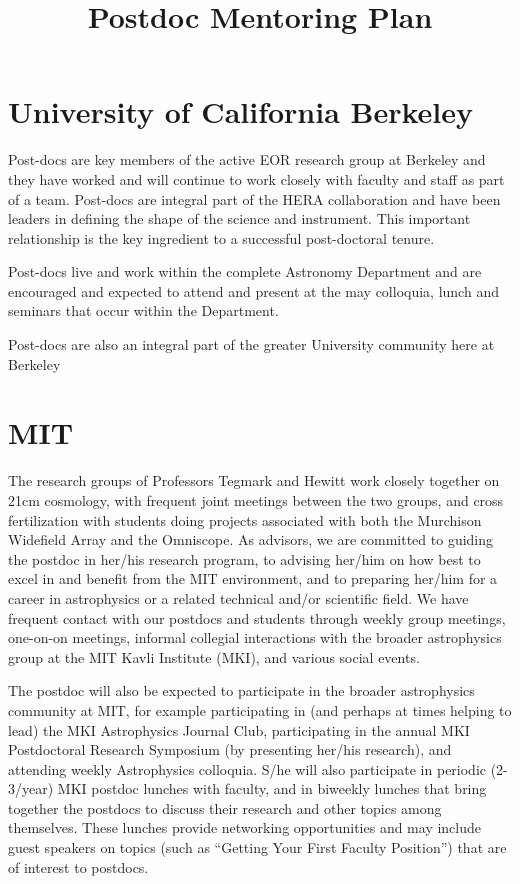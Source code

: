 \documentclass[preprint]{aastex}
\begin{document}
\title{Postdoc Mentoring Plan}

\section{University of California Berkeley}
Post-docs are key members of the active EOR research group at Berkeley and they have worked and will 
continue to work closely with faculty and staff as part of a team.  Post-docs are integral part of the HERA
collaboration and have been leaders in defining the shape of the science and instrument.  This important
relationship is the key ingredient to a successful post-doctoral tenure.

Post-docs live and work within the complete Astronomy Department and are encouraged and 
expected to attend and present at the may colloquia, lunch and seminars that occur within the 
Department.

Post-docs are also an integral part of the greater University community here at Berkeley

\section{MIT}
The research groups of Professors Tegmark and Hewitt work closely together on 21cm
cosmology, with frequent joint meetings between the two groups, and cross
fertilization with students doing projects associated with both the Murchison
Widefield Array and the Omniscope. As advisors, we are committed to guiding the
postdoc in her/his research program, to advising her/him on how best to excel in and
benefit from the MIT environment, and to preparing her/him for a career in
astrophysics or a related technical and/or scientific field. We have frequent contact
with our postdocs and students through weekly group meetings, one-on-on meetings,
informal collegial interactions with the broader astrophysics group at the MIT Kavli
Institute (MKI), and various social events.

The postdoc will also be expected to participate in the broader astrophysics
community at MIT, for example participating in (and perhaps at times helping to lead)
the MKI Astrophysics Journal Club, participating in the annual MKI Postdoctoral
Research Symposium (by presenting her/his research), and attending weekly
Astrophysics colloquia. S/he will also participate in periodic (2-3/year) MKI postdoc
lunches with faculty, and in biweekly lunches that bring together the postdocs to
discuss their research and other topics among themselves. These lunches provide
networking opportunities and may include guest speakers on topics (such as “Getting
Your First Faculty Position”) that are of interest to postdocs.
\end{document}
